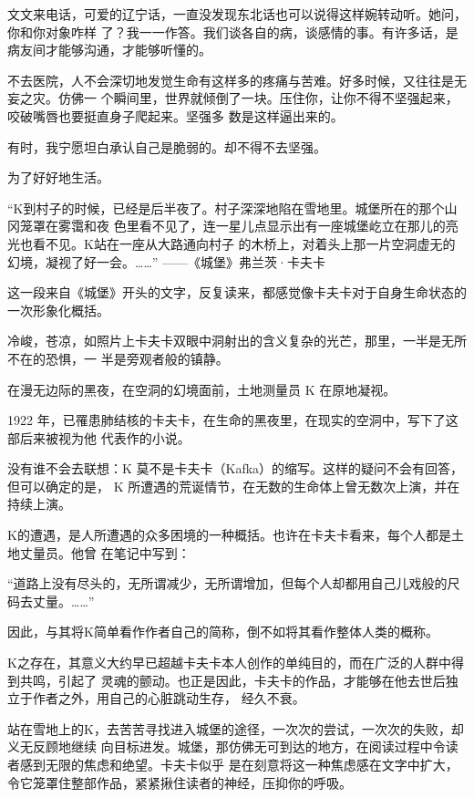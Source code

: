 		文文来电话，可爱的辽宁话，一直没发现东北话也可以说得这样婉转动听。她问，你和你对象咋样
	了？我一一作答。我们谈各自的病，谈感情的事。有许多话，是病友间才能够沟通，才能够听懂的。

		不去医院，人不会深切地发觉生命有这样多的疼痛与苦难。好多时候，又往往是无妄之灾。仿佛一
	个瞬间里，世界就倾倒了一块。压住你，让你不得不坚强起来，咬破嘴唇也要挺直身子爬起来。坚强多
	数是这样逼出来的。

		有时，我宁愿坦白承认自己是脆弱的。却不得不去坚强。

		为了好好地生活。

	\endwriting



		“K到村子的时候，已经是后半夜了。村子深深地陷在雪地里。城堡所在的那个山冈笼罩在雾霭和夜
	色里看不见了，连一星儿点显示出有一座城堡屹立在那儿的亮光也看不见。K站在一座从大路通向村子
	的木桥上，对着头上那一片空洞虚无的幻境，凝视了好一会。……” ——《城堡》弗兰茨·卡夫卡

		这一段来自《城堡》开头的文字，反复读来，都感觉像卡夫卡对于自身生命状态的一次形象化概括。

		冷峻，苍凉，如照片上卡夫卡双眼中洞射出的含义复杂的光芒，那里，一半是无所不在的恐惧，一
	半是旁观者般的镇静。

		在漫无边际的黑夜，在空洞的幻境面前，土地测量员 K 在原地凝视。

		1922 年，已罹患肺结核的卡夫卡，在生命的黑夜里，在现实的空洞中，写下了这部后来被视为他
	代表作的小说。

		没有谁不会去联想：K 莫不是卡夫卡（Kafka）的缩写。这样的疑问不会有回答，但可以确定的是，
	K 所遭遇的荒诞情节，在无数的生命体上曾无数次上演，并在持续上演。

		K的遭遇，是人所遭遇的众多困境的一种概括。也许在卡夫卡看来，每个人都是土地丈量员。他曾
	在笔记中写到：

		“道路上没有尽头的，无所谓减少，无所谓增加，但每个人却都用自己儿戏般的尺码去丈量。……”

		因此，与其将K简单看作作者自己的简称，倒不如将其看作整体人类的概称。

		K之存在，其意义大约早已超越卡夫卡本人创作的单纯目的，而在广泛的人群中得到共鸣，引起了
	灵魂的颤动。也正是因此，卡夫卡的作品，才能够在他去世后独立于作者之外，用自己的心脏跳动生存，
	经久不衰。

		站在雪地上的K，去苦苦寻找进入城堡的途径，一次次的尝试，一次次的失败，却义无反顾地继续
	向目标进发。城堡，那仿佛无可到达的地方，在阅读过程中令读者感到无限的焦虑和绝望。卡夫卡似乎
	是在刻意将这一种焦虑感在文字中扩大，令它笼罩住整部作品，紧紧揪住读者的神经，压抑你的呼吸。

